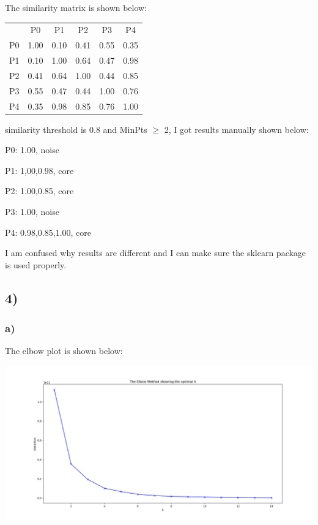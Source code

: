 \documentclass{article}
\begin{document}
The similarity matrix is shown below:

\begin{center}
\begin{tabular}{ c c c c c c}

 & P0 & P1 & P2 & P3 & P4 \\

P0 & 1.00 & 0.10 & 0.41 & 0.55 & 0.35 \\

P1 & 0.10 & 1.00 & 0.64 & 0.47 & 0.98 \\
 
P2 & 0.41 & 0.64 & 1.00 & 0.44 & 0.85 \\ 
 
P3 & 0.55 & 0.47 & 0.44 & 1.00 & 0.76 \\
 
P4 & 0.35 & 0.98 & 0.85 & 0.76 & 1.00

\end{tabular}
\end{center}

similarity threshold is 0.8 and MinPts $\geq$ 2, I got results manually shown below:

P0: 1.00, noise

P1: 1,00,0.98, core

P2: 1.00,0.85, core

P3: 1.00, noise

P4: 0.98,0.85,1.00, core

I am confused why results are different and I can make sure the sklearn package is used properly.

\subsection{4)}

\subsubsection{a)}

The elbow plot is shown below:

\includegraphics[scale=0.3]{elbow.png}
\end{document}
